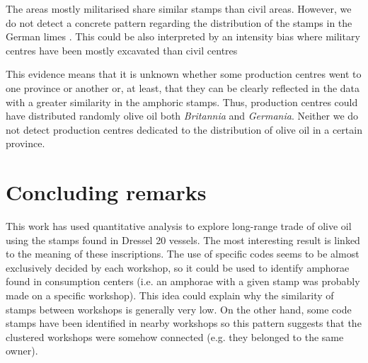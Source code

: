 \documentclass[review]{elsarticle}
\newcommand{\memo}[2]{\textcolor{#1}{#2}}
\newcommand{\xavi}[1]{\memo{magenta}{XRC: #1\\}}
\begin{document}

The areas mostly militarised share similar stamps than civil areas. However, we do not detect a concrete pattern regarding the distribution of the stamps in the German limes \citep{xanten2018}. This could be also interpreted by an intensity bias where military centres have been mostly excavated than civil centres



This evidence means that it is unknown whether some production centres went to one province or another or, at least, that they can be clearly reflected in the data with a greater similarity in the amphoric stamps. Thus, production centres could have distributed randomly olive oil both \textit{Britannia} and \textit{Germania}. Neither we do not detect production centres dedicated to the distribution of olive oil in a certain province. 




\section{Concluding remarks}

This work has used quantitative analysis to explore long-range trade of olive oil using the stamps found in Dressel 20 vessels. The most interesting result is linked to the meaning of these inscriptions. The use of specific codes seems to be almost exclusively decided by each workshop, so it could be used to identify amphorae found in consumption centers (i.e. an amphorae with a given stamp was probably made on a specific workshop). This idea could explain why the similarity of stamps between workshops is generally very low. On the other hand, some code stamps have been identified in nearby workshops so this pattern suggests that the clustered workshops were somehow connected (e.g. they belonged to the same owner).
\end{document}
